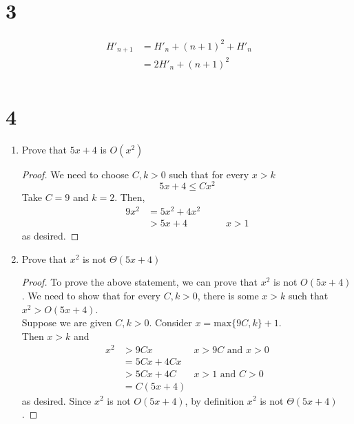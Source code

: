 \documentclass[11pt]{scrartcl}
\begin{document}
\section{3}
\begin{align*}
	H'_{n+1} & = H'_{n} + (n+1)^2 + H'_{n}\\
	& = 2H'_{n} + (n+1)^2\\
\end{align*}

\section{4}
\begin{enumerate}[label=\alph*.]
	\item{
	Prove that $5x + 4$ is $O(x^2)$
	\begin{proof}
		We need to choose $C, k > 0$ such that for every $x > k$
		\[
			5x + 4 \leq Cx^2
		\]
		Take $C = 9$ and $k = 2$. Then,
		\begin{align*}
			9x^2 & = 5x^2 + 4x^2\\
			& > 5x + 4 \qquad \qquad x > 1
		\end{align*}
		as desired. 
	\end{proof}
	}
	\item{
		Prove that $x^2$ is not $\Theta(5x + 4)$
		\begin{proof}
		To prove the above statement, we can prove that $x^2$ is not $O(5x+4)$.
		We need to show that for every $C, k > 0$, there is some $x > k$ such that 
		$x^2 > O(5x+4)$.\\
		Suppose we are given $C, k > 0$. Consider $x = \text{max}\{9C, k\} + 1$.\\
		Then $x>k$ and 
		\begin{align*}
			x^2 & > 9Cx & x > 9C \text{ and } x > 0\\
			& = 5Cx + 4Cx\\
			& > 5Cx + 4C & x > 1 \text{ and } C > 0\\
			& = C(5x+4)
		\end{align*}
		as desired. Since $x^2$ is not $O(5x+4)$, by definition $x^2$ is not $\Theta(5x + 4)$.
		\end{proof}
	}
\end{enumerate}
\end{document}
